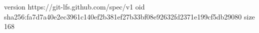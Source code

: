 version https://git-lfs.github.com/spec/v1
oid sha256:fa7d7a40e2ec3961c140ef2b381ef27b33bf08e92632fd2371e199cf5db29080
size 168
